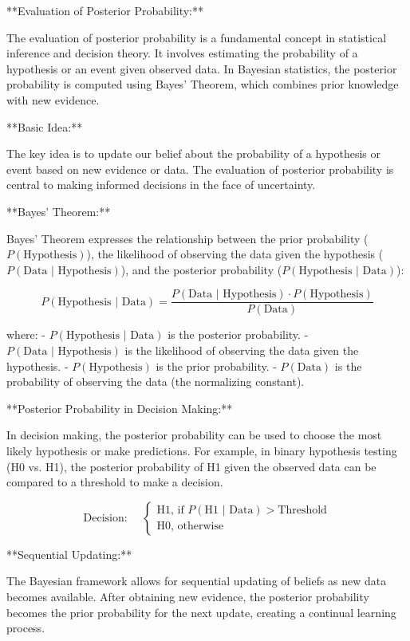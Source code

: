 \documentclass[../../../../DMCC-My-Notebook]{subfiles}
\begin{document}
	
	
	
	**Evaluation of Posterior Probability:**
	
	The evaluation of posterior probability is a fundamental concept in statistical inference and decision theory. It involves estimating the probability of a hypothesis or an event given observed data. In Bayesian statistics, the posterior probability is computed using Bayes' Theorem, which combines prior knowledge with new evidence.
	
	**Basic Idea:**
	
	The key idea is to update our belief about the probability of a hypothesis or event based on new evidence or data. The evaluation of posterior probability is central to making informed decisions in the face of uncertainty.
	
	**Bayes' Theorem:**
	
	Bayes' Theorem expresses the relationship between the prior probability (\(P(\text{Hypothesis})\)), the likelihood of observing the data given the hypothesis (\(P(\text{Data | Hypothesis})\)), and the posterior probability (\(P(\text{Hypothesis | Data})\)):
	
	\[ P(\text{Hypothesis | Data}) = \frac{P(\text{Data | Hypothesis}) \cdot P(\text{Hypothesis})}{P(\text{Data})} \]
	
	where:
	- \( P(\text{Hypothesis | Data}) \) is the posterior probability.
	- \( P(\text{Data | Hypothesis}) \) is the likelihood of observing the data given the hypothesis.
	- \( P(\text{Hypothesis}) \) is the prior probability.
	- \( P(\text{Data}) \) is the probability of observing the data (the normalizing constant).
	
	**Posterior Probability in Decision Making:**
	
	In decision making, the posterior probability can be used to choose the most likely hypothesis or make predictions. For example, in binary hypothesis testing (H0 vs. H1), the posterior probability of H1 given the observed data can be compared to a threshold to make a decision.
	
	\[ \text{Decision: } \quad
	\begin{cases}
		\text{H1, if } P(\text{H1 | Data}) > \text{Threshold} \\
		\text{H0, otherwise}
	\end{cases}
	\]
	
	**Sequential Updating:**
	
	The Bayesian framework allows for sequential updating of beliefs as new data becomes available. After obtaining new evidence, the posterior probability becomes the prior probability for the next update, creating a continual learning process.
	
\end{document}
